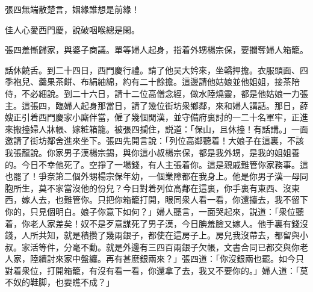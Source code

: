 \begin{myquote}
張四無端散楚言，姻緣誰想是前緣！

佳人心愛西門慶，說破咽喉總是閑。
\end{myquote}

張四羞慚歸家，與婆子商議。單等婦人起身，指着外甥楊宗保，要攔奪婦人箱籠。

話休饒舌。到二十四日，西門慶行禮。請了他吴大妗來，坐轎押擔。衣服頭面、四季袍兒、羹果茶餅、布絹紬綿，約有二十餘擔。這邊請他姑娘並他姐姐，接茶陪侍，不必細說。到二十六日，請十二位高僧念經，做水陸燒靈，都是他姑娘一力張主。這張四，臨婦人起身那當日，請了幾位街坊衆鄉鄰，來和婦人講話。那日，薛嫂正引着西門慶家小廝伴當，僱了幾個閒漢，並守備府裏討的一二十名軍牢，正進來搬擡婦人牀帳、嫁粧箱籠。被張四攔住，説道：「保山，且休擡！有話講。」一面邀請了街坊鄰舍進來坐下。張四先開言說：「列位高鄰聽着！大娘子在這裏，不該我張龍說。你家男子漢楊宗錫，與你這小叔楊宗保，都是我外甥，是我的姐姐養的。今日不幸他死了。空掙了一場錢，有人主張着你。這是親戚難管你家務事。這也罷了！爭奈第二個外甥楊宗保年幼，一個業障都在我身上。他是你男子漢一母同胞所生，莫不家當沒他的份兒？今日對着列位高鄰在這裏，你手裏有東西、沒東西，嫁人去，也難管你。只把你箱籠打開，眼同衆人看一看，你還擡去，我不留下你的，只見個明白。娘子你意下如何？」婦人聽言，一面哭起來，説道：「衆位聽着，你老人家差矣！奴不是歹意謀死了男子漢，今日腆羞臉又嫁人。他手裏有錢沒錢，人所共知，就是積攢了幾兩銀子，都使在這房子上。房兒我沒帶去，都留與小叔。家活等件，分毫不動。就是外邊有三四百兩銀子欠帳，文書合同已都交與你老人家，陸續討來家中盤纏。再有甚麽銀兩來？」張四道：「你沒銀兩也罷。如今只對着衆位，打開箱籠，有沒有看一看，你還拿了去，我又不要你的。」婦人道：「莫不奴的鞋脚，也要瞧不成？」

